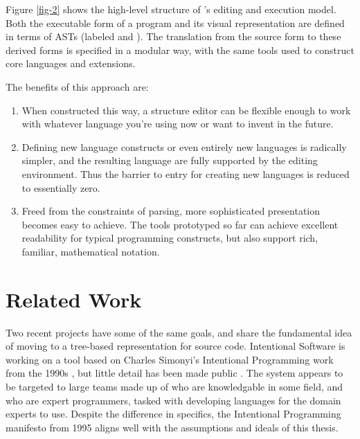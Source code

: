 Figure \ref{fig-2} shows the high-level structure of \Meta's editing and execution model. Both the executable form of a program and its visual representation are defined in terms of ASTs (labeled  and ). The translation from the source form to these derived forms is specified in a modular way, with the same tools used to construct core languages and extensions.

The benefits of this approach are:

\begin{enumerate}

\item When constructed this way, a structure editor can be flexible enough to work with whatever language you're using now or want to invent in the future.

\item Defining new language constructs or even entirely new languages is radically simpler, and the resulting language are fully supported by the editing environment. Thus the barrier to entry for creating new languages is reduced to essentially zero.

\item Freed from the constraints of parsing, more sophisticated presentation becomes easy to achieve. The tools prototyped so far can achieve excellent readability for typical programming constructs, but also support rich, familiar, mathematical notation.

\end{enumerate}

%
%
\section{Related Work}

Two recent projects have some of the same goals, and share the fundamental idea of moving to a tree-based representation for source code. Intentional Software is working on a tool based on Charles Simonyi's Intentional Programming work from the 1990s \cite{simonyi}, but little detail has been made public \cite{intentional}. The system appears to be targeted to large teams made up of  who are knowledgable in some field, and  who are expert programmers, tasked with developing languages for the domain experts to use. Despite the difference in specifics, the Intentional Programming manifesto from 1995 aligns well with the assumptions and ideals of this thesis.

